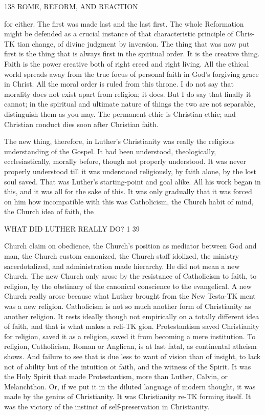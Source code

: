 \documentclass[12pt,a5paper,twoside]{book}
\begin{document}
{138 ROME, REFORM, AND REACTION 

for either. The first was made last and the last first. 
The whole Reformation might be defended as a 
crucial instance of that characteristic principle of Chris-TK
tian change, of divine judgment by inversion. The 
thing that was now put first is the thing that is always 
first in the spiritual order. It is the creative thing. 
Faith is the power creative both of right creed and 
right living. All the ethical world spreads away from 
the true focus of personal faith in God's forgiving grace 
in Christ. All the moral order is ruled from this 
throne. I do not say that morality does not exist 
apart from religion; it does. But I do say that 
finally it cannot; in the spiritual and ultimate nature 
of things the two are not separable, distinguish them 
as you may. The permanent ethic is Christian ethic; 
and Christian conduct dies soon after Christian faith. 

The new thing, therefore, in Luther's Christianity 
was really the religious understanding of the Gospel. 
It had been understood, theologically, ecclesiastically, 
morally before, though not properly understood. It 
was never properly understood till it was understood 
religiously, by faith alone, by the lost soul saved. 
That was Luther's starting-point and goal alike. All 
his work began in this, and it was all for the sake of 
this. It was only gradually that it was forced on him 
how incompatible with this was Catholicism, the 
Church habit of mind, the Church idea of faith, the 



WHAT DID LUTHER REALLY DO? 1 39 

Church claim on obedience, the Church's position as 
mediator between God and man, the Church custom 
canonized, the Church staff idolized, the ministry 
sacerdotalized, and administration made hierarchy. 
He did not mean a new Church. The new Church 
only arose by the resistance of Catholicism to faith, to 
religion, by the obstinacy of the canonical conscience 
to the evangelical. A new Church really arose 
because what Luther brought from the New Testa-TK
ment was a new religion. Catholicism is not so 
much another form of Christianity as another religion. 
It rests ideally though not empirically on a totally 
different idea of faith, and that is what makes a reli-TK
gion. Protestantism saved Christianity for religion, 
saved it as a religion, saved it from becoming a mere 
institution. To religion, Catholicism, Roman or 
Anglican, is at last fatal, as continental atheism shows. 
And failure to see that is due less to want of vision than 
of insight, to lack not of ability but of the intuition ot 
faith, and the witness of the Spirit. It was the Holy 
Spirit that made Protestantism, more than Luther, 
Calvin, or Melanchthon. Or, if we put it in the 
diluted language of modern thought, it was made by 
the genius of Christianity. It was Christianity re-TK
forming itself. It was the victory of the instinct 
of self-preservation in Christianity. 

}
\end{document}

